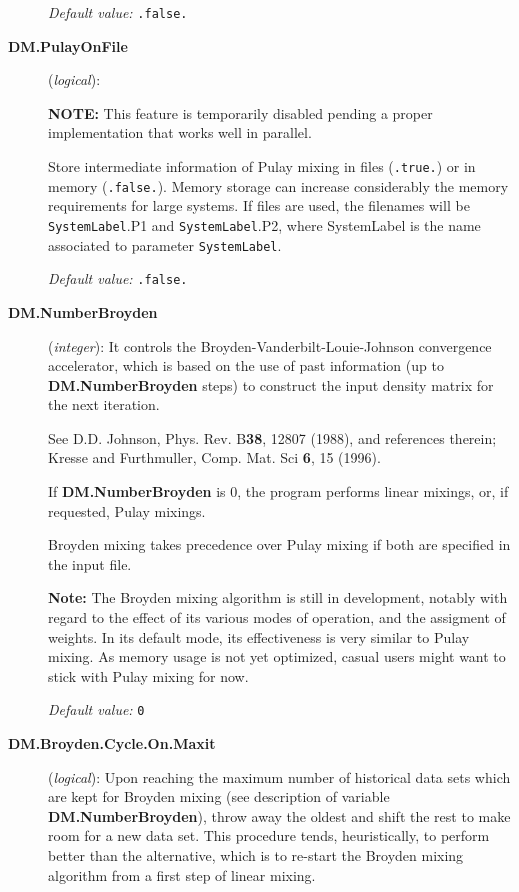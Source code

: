 \documentclass[11pt]{article}
\begin{document}
\begin{description}
{\it Default value:} {\tt .false.}


\item[{\bf DM.PulayOnFile}] ({\it logical}):

{\bf NOTE:} This feature is temporarily disabled pending a proper
implementation that works well in parallel.

Store intermediate information of Pulay mixing in files
({\tt .true.}) or in memory ({\tt .false.}).
Memory storage can increase considerably the
memory requirements for large systems.
If files are used, the filenames will be
{\tt SystemLabel}.P1 and
{\tt SystemLabel}.P2,
where SystemLabel is the name associated
to parameter {\tt SystemLabel}.

{\it Default value:} {\tt .false.}

\item[{\bf DM.NumberBroyden}] ({\it integer}):
It controls the Broyden-Vanderbilt-Louie-Johnson
convergence accelerator, which is based on the use of past information
(up to {\bf DM.NumberBroyden} steps) to construct the input density
matrix for the next iteration.

See D.D. Johnson, Phys. Rev. B{\bf 38}, 12807 (1988), and references therein;
Kresse and Furthmuller, Comp. Mat. Sci {\bf 6}, 15 (1996).

If {\bf DM.NumberBroyden} is 0, the program performs linear mixings,
or, if requested, Pulay mixings.

Broyden mixing takes precedence over Pulay mixing if both are
specified in the input file.

{\bf Note:} The Broyden mixing algorithm is still in development,
notably with regard to the effect of its various modes of operation, and
the assigment of weights. In its default mode, its effectiveness is
very similar to Pulay mixing. As memory usage is not yet optimized,
casual users might want to stick with Pulay mixing for now.

{\it Default value:} {\tt 0}

\item[{\bf DM.Broyden.Cycle.On.Maxit}] ({\it logical}):
Upon reaching the maximum number of historical data sets which are
kept for Broyden mixing (see description of variable {\bf
  DM.NumberBroyden}), throw away the oldest and shift the rest to make
room for a new data set. This procedure tends, heuristically, to
perform better than the alternative, which is to re-start the Broyden
mixing algorithm from a first step of linear mixing.


\end{description}
\end{document}
